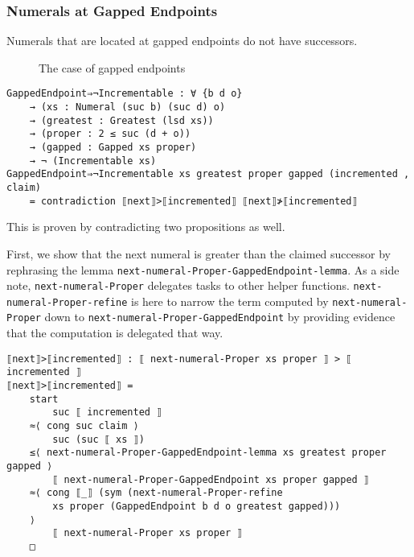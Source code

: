 \documentclass[\main/thesis.tex]{subfiles}
\begin{document}
\subsubsection{Numerals at Gapped Endpoints}

Numerals that are located at gapped endpoints do not have successors.

\begin{figure}[H]
    \centering
    \begin{adjustbox}{max width=\textwidth}
    \end{adjustbox}
\caption{The case of gapped endpoints}
\label{figure:27}
\end{figure}

\begin{lstlisting}[basicstyle=\ttfamily\scriptsize]
GappedEndpoint⇒¬Incrementable : ∀ {b d o}
    → (xs : Numeral (suc b) (suc d) o)
    → (greatest : Greatest (lsd xs))
    → (proper : 2 ≤ suc (d + o))
    → (gapped : Gapped xs proper)
    → ¬ (Incrementable xs)
GappedEndpoint⇒¬Incrementable xs greatest proper gapped (incremented , claim)
    = contradiction ⟦next⟧>⟦incremented⟧ ⟦next⟧≯⟦incremented⟧
\end{lstlisting}

This is proven by contradicting two propositions as well.

First, we show that the next numeral is greater than the claimed successor
by rephrasing the lemma \lstinline|next-numeral-Proper-GappedEndpoint-lemma|.
As a side note, \lstinline|next-numeral-Proper| delegates tasks to other helper
functions. \lstinline|next-numeral-Proper-refine| is here to narrow the term
computed by \lstinline|next-numeral-Proper| down to
\lstinline|next-numeral-Proper-GappedEndpoint|
by providing evidence that the computation is delegated that way.

\begin{lstlisting}[basicstyle=\ttfamily\scriptsize]
⟦next⟧>⟦incremented⟧ : ⟦ next-numeral-Proper xs proper ⟧ > ⟦ incremented ⟧
⟦next⟧>⟦incremented⟧ =
    start
        suc ⟦ incremented ⟧
    ≈⟨ cong suc claim ⟩
        suc (suc ⟦ xs ⟧)
    ≤⟨ next-numeral-Proper-GappedEndpoint-lemma xs greatest proper gapped ⟩
        ⟦ next-numeral-Proper-GappedEndpoint xs proper gapped ⟧
    ≈⟨ cong ⟦_⟧ (sym (next-numeral-Proper-refine
        xs proper (GappedEndpoint b d o greatest gapped)))
    ⟩
        ⟦ next-numeral-Proper xs proper ⟧
    □
\end{lstlisting}
\end{document}
